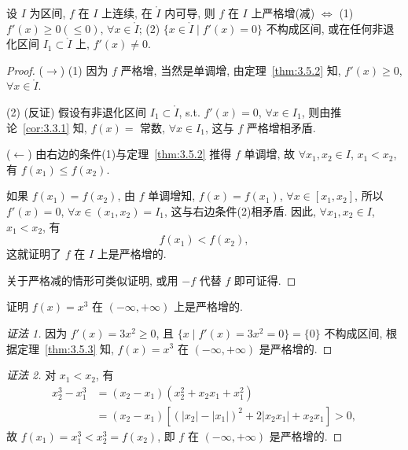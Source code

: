 \begin{theorem}\label{thm:3.5.3}
设 $I$ 为区间, $f$ 在 $I$ 上连续, 在 $\mathring{I}$ 内可导, 则 $f$ 在 $I$ 上严格增(减) $\Longleftrightarrow$
(1) $f'(x)\geqslant 0(\leqslant 0)$, $\forall x\in\mathring{I}$; (2) $\{x\in\mathring{I}\mid f'(x)=0\}$ 不构成区间, 或在任何非退化区间 $I_{1}\subset\mathring{I}$ 上, $f'(x)\neq 0$.
\end{theorem}

\begin{proof}
($\rightarrow$) (1) 因为 $f$ 严格增, 当然是单调增, 由定理~\ref{thm:3.5.2} 知, $f'(x)\geqslant 0$, $\forall x\in\mathring{I}$.

(2) (反证) 假设有非退化区间 $I_{1}\subset\mathring{I}$, s.t. $f'(x)=0$, $\forall x\in I_{1}$, 则由推论~\ref{cor:3.3.1} 知, $f(x)=$ 常数, $\forall x\in I_{1}$, 这与 $f$ 严格增相矛盾.

($\leftarrow$) 由右边的条件(1)与定理~\ref{thm:3.5.2} 推得 $f$ 单调增, 故 $\forall x_{1},x_{2}\in I$, $x_{1}<x_{2}$, 有 $f(x_{1})\leqslant f(x_{2})$.

如果 $f(x_{1})=f(x_{2})$, 由 $f$ 单调增知, $f(x)=f(x_{1})$, $\forall x\in[x_{1},x_{2}]$, 所以 $f'(x)=0$, $\forall x\in(x_{1},x_{2})=I_{1}$, 这与右边条件(2)相矛盾. 因此, $\forall x_{1},x_{2}\in I$, $x_{1}<x_{2}$, 有
\[
f(x_{1})<f(x_{2}),
\]
这就证明了 $f$ 在 $I$ 上是严格增的.

关于严格减的情形可类似证明, 或用 $-f$ 代替 $f$ 即可证得.
\end{proof}

\begin{example}\label{ex:3.5.1}
证明 $f(x)=x^{3}$ 在 $(-\infty,+\infty)$ 上是严格增的.
\end{example}

\begin{proof}[证法 1]
因为 $f'(x)=3x^{2}\geqslant 0$, 且 $\{x\mid f'(x)=3x^{2}=0\}=\{0\}$ 不构成区间, 根据定理~\ref{thm:3.5.3} 知, $f(x)=x^{3}$ 在 $(-\infty,+\infty)$ 是严格增的.
\end{proof}

\begin{proof}[证法 2]
对 $x_{1}<x_{2}$, 有
\[
\begin{aligned}
x_{2}^{3}-x_{1}^{3}&=(x_{2}-x_{1})(x_{2}^{2}+x_{2}x_{1}+x_{1}^{2})\\
&=(x_{2}-x_{1})[(|x_{2}|-|x_{1}|)^{2}+2|x_{2}x_{1}|+x_{2}x_{1}]>0,
\end{aligned}
\]
故 $f(x_{1})=x_{1}^{3}<x_{2}^{3}=f(x_{2})$, 即 $f$ 在 $(-\infty,+\infty)$ 是严格增的.
\end{proof}

